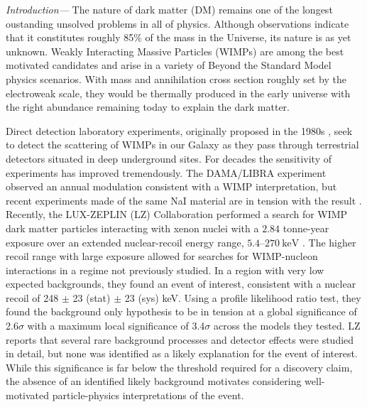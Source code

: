 \documentclass[
aps,
prl,
reprint,
superscriptaddress,
nofootinbib,
nobibnotes
]{revtex4-2}
\begin{document}
\maketitle

\textit{Introduction---}
The nature of dark matter (DM) remains one of the longest oustanding unsolved problems in all of physics. Although observations indicate that it constitutes roughly 85\% of the mass in the Universe, its nature is as yet unknown. Weakly Interacting Massive Particles (WIMPs) are among the best  motivated candidates and arise in a variety of Beyond the Standard Model physics scenarios.
With mass and annihilation cross section roughly set  by the electroweak scale, they would be thermally produced in the early universe with the right abundance remaining today to explain the dark matter.

Direct detection laboratory experiments, originally proposed in the 1980s 
 \cite{Goodman:1984dc,Drukier:1986tm},
seek to detect the scattering of WIMPs in our Galaxy as they
pass through terrestrial detectors situated in deep underground sites.
For decades the sensitivity of experiments has improved tremendously. The DAMA/LIBRA experiment observed an annual modulation 
consistent with a WIMP interpretation\cite{Bernabei:2013xsa}, but recent experiments made of the same NaI material are in tension with the result \cite{ANAIS-112:2025fne}.
Recently, the LUX-ZEPLIN (LZ) Collaboration 
performed a search for WIMP dark matter particles interacting with xenon nuclei with a $2.84$ tonne-year exposure over an extended nuclear-recoil energy range, $5.4$--$270~\mathrm{keV}$ \cite{LZ:2026}.  
The higher recoil range with large exposure allowed for searches for 
WIMP-nucleon interactions in a regime not previously studied.  
In a region with very low expected backgrounds, they found an event of interest, consistent with a nuclear recoil of 248 $\pm$ 23 (stat) $\pm$ 23 (sys) keV.  Using a profile likelihood ratio test, they found the background only hypothesis to be in tension at a global significance of 2.6$\sigma$ with a maximum local significance of 3.4$\sigma$ across the models they tested.
LZ reports that several rare background processes and detector effects were studied in detail, but none was identified as a likely explanation for the event of interest. While this significance is far below the threshold required for a discovery claim, the absence of an identified likely background motivates considering well-motivated particle-physics interpretations of the event.
\end{document}
